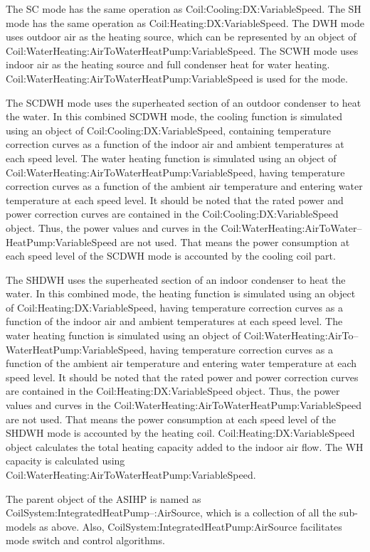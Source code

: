 The SC mode has the same operation as Coil:Cooling:DX:VariableSpeed. The SH mode has the same operation as Coil:Heating:DX:VariableSpeed. The DWH mode uses outdoor air as the heating source, which can be represented by an object of Coil:WaterHeating:AirToWaterHeatPump:VariableSpeed. The SCWH mode uses indoor air as the heating source and full condenser heat for water heating.  Coil:WaterHeating:AirToWaterHeatPump:VariableSpeed is used for the mode. 

The SCDWH mode uses the superheated section of an outdoor condenser to heat the water. In this combined SCDWH mode, the cooling function is simulated using an object of Coil:Cooling:DX:VariableSpeed, containing temperature correction curves as a function of the indoor air and ambient temperatures at each speed level. The water heating function is simulated using an object of Coil:WaterHeating:AirToWaterHeatPump:VariableSpeed, having temperature correction curves as a function of the ambient air temperature and entering water temperature at each speed level.  It should be noted that the rated power and power correction curves are contained in the Coil:Cooling:DX:VariableSpeed object. Thus, the power values and curves in the Coil:WaterHeating:AirToWater--HeatPump:VariableSpeed are not used. That means the power consumption at each speed level of the SCDWH mode is accounted by the cooling coil part. 

The SHDWH uses the superheated section of an indoor condenser to heat the water. In this combined mode, the heating function is simulated using an object of Coil:Heating:DX:VariableSpeed, having temperature correction curves as a function of the indoor air and ambient temperatures at each speed level. The water heating function is simulated using an object of Coil:WaterHeating:AirTo--WaterHeatPump:VariableSpeed, having temperature correction curves as a function of the ambient air temperature and entering water temperature at each speed level. It should be noted that the rated power and power correction curves are contained in the Coil:Heating:DX:VariableSpeed object. Thus, the power values and curves in the Coil:WaterHeating:AirToWaterHeatPump:VariableSpeed are not used. That means the power consumption at each speed level of the SHDWH mode is accounted by the heating coil. Coil:Heating:DX:VariableSpeed object calculates the total heating capacity added to the indoor air flow. The WH capacity is calculated using Coil:WaterHeating:AirToWaterHeatPump:VariableSpeed. 

The parent object of the ASIHP is named as CoilSystem:IntegratedHeatPump--:AirSource, which is a collection of all the sub-models as above. Also, CoilSystem:IntegratedHeatPump:AirSource facilitates mode switch and control algorithms. 


